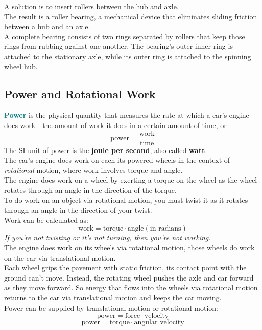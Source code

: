 \documentclass[12pt]{article}
\theoremstyle{definition}
\newcommand{\defnterm}[1]{\textbf{\textcolor{teal}{#1}}\index{#1}}
\begin{document}
A solution is to insert rollers between the hub and axle. \\
The result is a roller bearing, a mechanical device that eliminates sliding friction between a hub and an axle. \\
A complete bearing consists of two rings separated by rollers that keep those rings from rubbing against one another.
The bearing's outer inner ring is attached to the stationary axle, while its outer ring is attached to the spinning wheel hub.

\subsection{Power and Rotational Work}
\defnterm{Power} is the physical quantity that measures the rate at which a car's engine does work---the amount of work it does in a certain amount of time, or
$$\text{power} = \frac{\text{work}}{\text{time}}$$
The SI unit of power is the \textbf{joule per second}, also called \textbf{watt}. \\

The car's engine does work on each its powered wheels in the context of \emph{rotational} motion, where work involves torque and angle. \\
The engine does work on a wheel by exerting a torque on the wheel as the wheel rotates through an angle in the direction of the torque. \\

To do work on an object via rotational motion, you must twist it as it rotates through an angle in the direction of your twist. \\
Work can be calculated as:
$$\text{work} = \text{torque} \cdot \text{angle}(\text{in radians})$$
\emph{If you're not twisting or it's not turning, then you're not working}. \\

The engine does work on its wheels via rotational motion, those wheels do work on the car via translational motion. \\
Each wheel grips the pavement with static friction, its contact point with the ground can't move.
Instead, the rotating wheel pushes the axle and car forward as they move forward.
So energy that flows into the wheels via rotational motion returns to the car via translational motion and keeps the car moving. \\

Power can be supplied by translational motion or rotational motion:
$$\text{power} = \text{force} \cdot \text{velocity}$$
$$\text{power} = \text{torque} \cdot \text{angular velocity}$$
\end{document}
